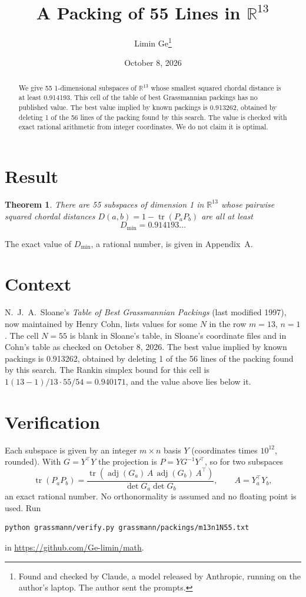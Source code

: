 \documentclass[11pt,a4paper]{article}
\title{A Packing of 55 Lines in $\mathbb{R}^{13}$}
\author{Limin Ge\thanks{Found and checked by Claude, a model released by Anthropic, running on the author's laptop. The author sent the prompts.}}
\date{October 8, 2026}
\newtheorem*{theorem}{Theorem}
\begin{document}
\maketitle
\begin{abstract}
We give 55 1-dimensional subspaces of $\mathbb{R}^{13}$ whose smallest squared chordal distance is at least 0.914193. This cell of the table of best Grassmannian packings has no published value. The best value implied by known packings is 0.913262, obtained by deleting 1 of the 56 lines of the packing found by this search. The value is checked with exact rational arithmetic from integer coordinates. We do not claim it is optimal.
\end{abstract}

\section{Result}
\begin{theorem}
There are 55 subspaces of dimension 1 in $\mathbb{R}^{13}$ whose pairwise squared chordal distances $D(a,b) = 1 - \operatorname{tr}(P_aP_b)$ are all at least
\[ D_{\min} = 0.914193\ldots \]
\end{theorem}
The exact value of $D_{\min}$, a rational number, is given in Appendix~A.


\section{Context}
N.~J.~A.~Sloane's \emph{Table of Best Grassmannian Packings} (last modified 1997), now maintained by Henry Cohn, lists values for some $N$ in the row $m=13$, $n=1$. The cell $N=55$ is blank in Sloane's table, in Sloane's coordinate files and in Cohn's table as checked on October 8, 2026. The best value implied by known packings is 0.913262, obtained by deleting 1 of the 56 lines of the packing found by this search. The Rankin simplex bound for this cell is $1(13-1)/13\cdot 55/54 = 0.940171$, and the value above lies below it.


\section{Verification}
Each subspace is given by an integer $m\times n$ basis $Y$ (coordinates times $10^{12}$, rounded). With $G=Y^\top Y$ the projection is $P=YG^{-1}Y^\top$, so for two subspaces
\[ \operatorname{tr}(P_aP_b)=\frac{\operatorname{tr}(\operatorname{adj}(G_a)\,A\,\operatorname{adj}(G_b)\,A^\top)}{\det G_a\det G_b},\qquad A=Y_a^\top Y_b, \]
an exact rational number. No orthonormality is assumed and no floating point is used. Run
\begin{verbatim}
python grassmann/verify.py grassmann/packings/m13n1N55.txt
\end{verbatim}
in \url{https://github.com/Ge-limin/math}.
\end{document}
